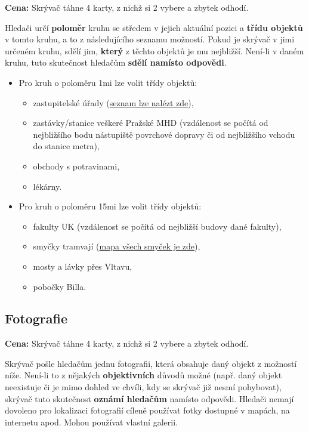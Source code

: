 \textbf{Cena:} Skrývač táhne 4 karty, z nichž si 2 vybere a zbytek odhodí.

Hledači určí \textbf{poloměr} kruhu se středem v jejich aktuální pozici a \textbf{třídu objektů} v tomto kruhu, a to z následujícího seznamu možností. Pokud je skrývač v jimi určeném kruhu, sdělí jim, \textbf{který} z těchto objektů je mu nejbližší. Není-li v daném kruhu, tuto skutečnost hledačům \textbf{sdělí namísto odpovědi}.

\begin{itemize}
	\item Pro kruh o poloměru \dist1mi lze volit třídy objektů:
	\begin{itemize}
		\item zastupitelské úřady (\href{https://cs.wikipedia.org/wiki/Seznam_zastupitelsk\%C3\%BDch_\%C3\%BA\%C5\%99ad\%C5\%AF_v_\%C4\%8Cesk\%C3\%A9_republice}{seznam lze nalézt zde}),
		\item zastávky/stanice veškeré Pražské MHD (vzdálenost se počítá od nejbližšího bodu nástupiště povrchové dopravy či od nejbližšího vchodu do stanice metra),
		\item obchody s potravinami,
		\item lékárny.
	\end{itemize}
	\item Pro kruh o poloměru \dist15mi lze volit třídy objektů:
	\begin{itemize}
		\item fakulty UK (vzdálenost se počítá od nejbližší budovy dané fakulty),
		\item smyčky tramvají (\href{https://mapy.com/s/fobosuzuzu}{mapa všech smyček je zde}),
		\item mosty a lávky přes Vltavu,
		\item pobočky Billa.
	\end{itemize}
\end{itemize}

\subsection{Fotografie}

\textbf{Cena:} Skrývač táhne 4 karty, z nichž si 2 vybere a zbytek odhodí.

Skrývač pošle hledačům jednu fotografii, která obsahuje daný objekt z možností níže. Není-li to z nějakých \textbf{objektivních} důvodů možné (např. daný objekt neexistuje či je mimo dohled ve chvíli, kdy se skrývač již nesmí pohybovat), skrývač tuto skutečnost \textbf{oznámí hledačům} namísto odpovědi. Hledači nemají dovoleno pro lokalizaci fotografií cíleně používat fotky dostupné v mapách, na internetu apod. Mohou používat vlastní galerii.


